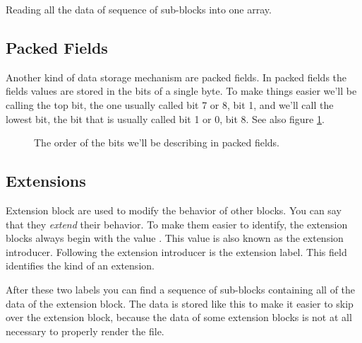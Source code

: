   \begin{algorithm}[H]
    \caption{Reading all the data of sequence of sub-blocks into one array.}
    \label{alg:gif-sub-blocks}
    \begin{algorithmic}[1]
      \Repeat
      \EndRepeatn


    \end{algorithmic}
  \end{algorithm}

  \subsection{Packed Fields}

  Another kind of data storage mechanism are packed fields. In packed
  fields the fields values are stored in the bits of a single byte. To
  make things easier we'll be calling the top bit, the one usually
  called bit 7 or 8, bit 1, and we'll call the lowest bit, the bit
  that is usually called bit 1 or 0, bit 8. See also figure
  \ref{fig:gif-packed-fields}.

  \begin{figure}
    \centering
    \caption{The order of the bits we'll be describing in packed fields.}
    \label{fig:gif-packed-fields}
  \end{figure}

  \subsection{Extensions}

  Extension block are used to modify the behavior of other blocks. You
  can say that they \textit{extend} their behavior. To make them
  easier to identify, the extension blocks always begin with the value
  . This value is also known as the extension
  introducer. Following the extension introducer is the extension
  label. This field identifies the kind of an extension.

  After these two labels you can find a sequence of sub-blocks
  containing all of the data of the extension block. The data is
  stored like this to make it easier to skip over the extension block,
  because the data of some extension blocks is not at all necessary to
  properly render the file.

